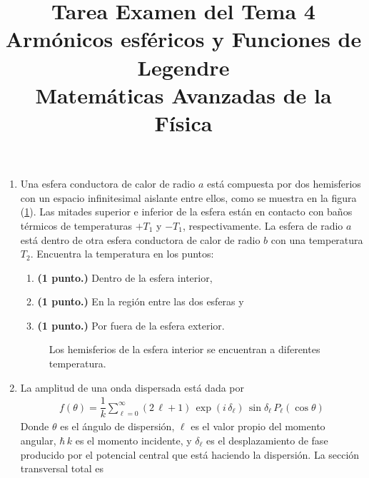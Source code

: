 
\author{}
\title{Tarea Examen del Tema 4  \\ \large{Armónicos esféricos y Funciones de Legendre\\ Matemáticas Avanzadas de la Física}} \vspace{-1.5\baselineskip}
\date{ }

\vspace{-4cm}
\renewcommand\labelenumii{\theenumi.{\arabic{enumii})}}
\maketitle
\fontsize{14}{14}\selectfont
\begin{enumerate}
\item Una esfera conductora de calor de radio $a$ está compuesta por dos hemisferios con un espacio infinitesimal aislante entre ellos, como se muestra en la figura (\ref{fig:figura2}). Las mitades superior e inferior de la esfera están en contacto con baños térmicos de temperaturas $+ T_{1}$ y $-T_{1}$, respectivamente. La esfera de radio $a$ está dentro de otra esfera conductora de calor de radio $b$ con una temperatura $T_{2}$. Encuentra la temperatura en los puntos:
\begin{enumerate}
\item \textbf{(1 punto.)} Dentro de la esfera interior,
\item \textbf{(1 punto.)} En la región entre las dos esferas y
\item \textbf{(1 punto.)} Por fuera de la esfera exterior.
\end{enumerate} 
\begin{figure}[!ht]
    \centering
    
    \caption{Los hemisferios de la esfera interior se encuentran a diferentes temperatura.}
    \label{fig:figura2}
\end{figure}
\item La amplitud de una onda dispersada está dada por
\begin{align*}
f(\theta) = \dfrac{1}{k} \sum_{\ell = 0}^{\infty} (2 \, \ell + 1) \, \exp(i \, \delta_{\ell}) \, \sin \delta_{\ell} \, P_{\ell} (\cos \theta)
\end{align*}
Donde $\theta$ es el ángulo de dispersión, $\ell$ es el valor propio del momento angular, $\hbar \, k$ es el momento incidente, y $\delta_{\ell}$ es el desplazamiento de fase producido por el potencial central que está haciendo la dispersión. La sección transversal total es 

\end{enumerate}

